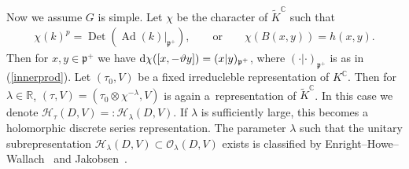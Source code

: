 \documentclass[pdftex]{sigma}
\numberwithin{equation}{section}
\newcommand{\BR}{\mathbb{R}}
\newcommand{\BC}{\mathbb{C}}
\newcommand{\fp}{\mathfrak{p}}
\newcommand{\cH}{\mathcal{H}}
\newcommand{\cO}{\mathcal{O}}
\newcommand{\Det}{\operatorname{Det}}
\begin{document}
Now we assume $G$ is simple. Let $\chi$ be the character of $\tilde{K}^\BC$ such that
\begin{gather}\label{char}
\chi(k)^p=\Det(\operatorname{Ad}(k)|_{\fp^+}),\qquad \text{or} \qquad \chi(B(x,y))=h(x,y).
\end{gather}
Then for $x,y\in\fp^+$ we have ${\rm d}\chi([x,-\vartheta y])=(x|y)_{\fp^+}$, where $(\cdot|\cdot)_{\fp^+}$ is as in (\ref{innerprod}).
Let $(\tau_0,V)$ be a fixed irreducleble representation of $K^\BC$.
Then for $\lambda\in\BR$, $(\tau,V)=(\tau_0\otimes\chi^{-\lambda},V)$ is again a~representation of $\tilde{K}^\BC$.
In this case we denote $\cH_\tau(D,V)=:\cH_\lambda(D,V)$.
If $\lambda$ is sufficiently large, this becomes a holomorphic discrete series representation.
The parameter $\lambda$ such that the unitary subrepresentation $\cH_\lambda(D,V)\subset\cO_\lambda(D,V)$ exists is classified by
Enright--Howe--Wallach~\cite{EHW} and Jakobsen~\cite{J}.
\end{document}
